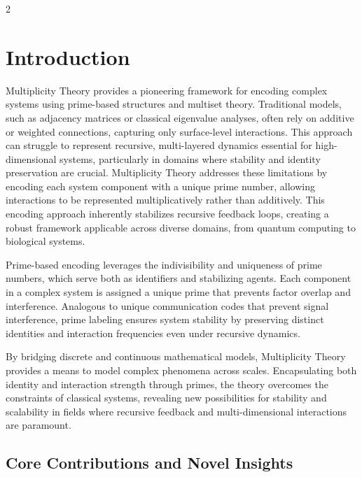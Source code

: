 \documentclass{article}
\begin{document}
\newpage
\begin{multicols}{2}
\begin{singlespace}
\tableofcontents
\end{singlespace}
\end{multicols}
\linenumbers
\section{Introduction}

Multiplicity Theory provides a pioneering framework for encoding complex systems using prime-based structures and multiset theory. Traditional models, such as adjacency matrices or classical eigenvalue analyses, often rely on additive or weighted connections, capturing only surface-level interactions. This approach can struggle to represent recursive, multi-layered dynamics essential for high-dimensional systems, particularly in domains where stability and identity preservation are crucial. Multiplicity Theory addresses these limitations by encoding each system component with a unique prime number, allowing interactions to be represented multiplicatively rather than additively. This encoding approach inherently stabilizes recursive feedback loops, creating a robust framework applicable across diverse domains, from quantum computing to biological systems.

Prime-based encoding leverages the indivisibility and uniqueness of prime numbers, which serve both as identifiers and stabilizing agents. Each component in a complex system is assigned a unique prime that prevents factor overlap and interference. Analogous to unique communication codes that prevent signal interference, prime labeling ensures system stability by preserving distinct identities and interaction frequencies even under recursive dynamics.

By bridging discrete and continuous mathematical models, Multiplicity Theory provides a means to model complex phenomena across scales. Encapsulating both identity and interaction strength through primes, the theory overcomes the constraints of classical systems, revealing new possibilities for stability and scalability in fields where recursive feedback and multi-dimensional interactions are paramount.

\subsection{Core Contributions and Novel Insights}
\end{document}
